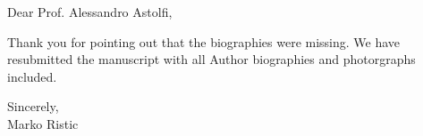 \documentclass{letter}
\begin{document}
\begin{letter}{}

\opening{Dear Prof. Alessandro Astolfi,}
Thank you for pointing out that the biographies were missing. We have resubmitted the manuscript with all Author biographies and photorgraphs included.
\closing{Sincerely,\\Marko Ristic}

\end{letter}
\end{document}
